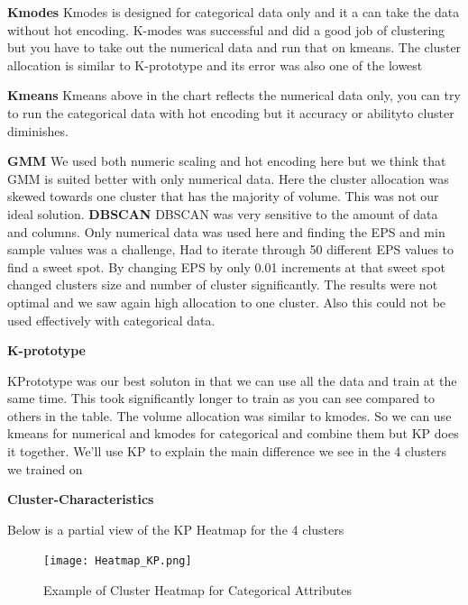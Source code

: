 \documentclass[conference]{IEEEtran}
\begin{document}
\textbf{Kmodes} \linebreak
Kmodes is designed for categorical data only and it a can take the data without hot encoding.  K-modes was successful and did a good job of clustering but you have to take out the numerical data and run that on kmeans.  The cluster allocation is similar to K-prototype and its error was also one of the lowest

\textbf{Kmeans} \linebreak
Kmeans above in the chart reflects the numerical data only,  you can try to run the categorical data with hot encoding but it accuracy or abilityto cluster diminishes.


\textbf{GMM} \linebreak
We used both numeric scaling and hot encoding here but we think that GMM is suited better with only numerical data.  Here the cluster allocation was skewed towards one cluster that has the majority of volume.  This was not our ideal solution.
\textbf{DBSCAN} \linebreak
DBSCAN was very sensitive to the amount of data and columns.  Only numerical data was used here and finding the EPS and min sample values was a challenge,  Had to iterate through 50 different EPS values to find a sweet spot.  By changing EPS by only 0.01 increments at that sweet spot changed clusters size and number of cluster significantly.  The results were not optimal and we saw again high allocation to one cluster.  Also this could not be used effectively with categorical data.

\textbf{K-prototype} \linebreak

KPrototype was our best soluton in that we can use all the data and train at the same time.  This took significantly longer to train as you can see compared to others in the table.  The volume allocation was similar to kmodes.  So we can use kmeans for numerical and kmodes for categorical and combine them but KP does it together.  We'll use KP to explain the main difference we see in the 4 clusters we trained on

\textbf{Cluster-Characteristics} \linebreak

Below is a partial view of the KP Heatmap for the 4 clusters

\begin{figure}[!h]
	\texttt{[image: Heatmap\_KP.png]}
	\caption{Example of Cluster Heatmap for Categorical Attributes }
	\label{fig: Cluster Heatmap for Categorical Attributes (4 Clusters)}
\end{figure}
\end{document}
